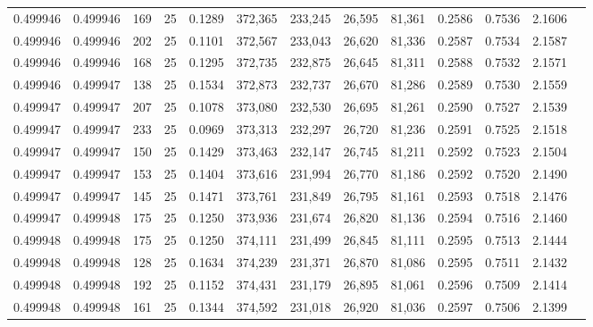 \begin{tabular}{rrrrrrrrrrrrr}
0.499946 & 0.499946 &   169 &  25 &                                     0.1289 & 372,365 & 233,245 &  26,595 &  81,361 & 0.2586 & 0.7536 & 2.1606 \\
0.499946 & 0.499946 &   202 &  25 &                                     0.1101 & 372,567 & 233,043 &  26,620 &  81,336 & 0.2587 & 0.7534 & 2.1587 \\
0.499946 & 0.499946 &   168 &  25 &                                     0.1295 & 372,735 & 232,875 &  26,645 &  81,311 & 0.2588 & 0.7532 & 2.1571 \\
0.499946 & 0.499947 &   138 &  25 &                                     0.1534 & 372,873 & 232,737 &  26,670 &  81,286 & 0.2589 & 0.7530 & 2.1559 \\
0.499947 & 0.499947 &   207 &  25 &                                     0.1078 & 373,080 & 232,530 &  26,695 &  81,261 & 0.2590 & 0.7527 & 2.1539 \\
0.499947 & 0.499947 &   233 &  25 &                                     0.0969 & 373,313 & 232,297 &  26,720 &  81,236 & 0.2591 & 0.7525 & 2.1518 \\
0.499947 & 0.499947 &   150 &  25 &                                     0.1429 & 373,463 & 232,147 &  26,745 &  81,211 & 0.2592 & 0.7523 & 2.1504 \\
0.499947 & 0.499947 &   153 &  25 &                                     0.1404 & 373,616 & 231,994 &  26,770 &  81,186 & 0.2592 & 0.7520 & 2.1490 \\
0.499947 & 0.499947 &   145 &  25 &                                     0.1471 & 373,761 & 231,849 &  26,795 &  81,161 & 0.2593 & 0.7518 & 2.1476 \\
0.499947 & 0.499948 &   175 &  25 &                                     0.1250 & 373,936 & 231,674 &  26,820 &  81,136 & 0.2594 & 0.7516 & 2.1460 \\
0.499948 & 0.499948 &   175 &  25 &                                     0.1250 & 374,111 & 231,499 &  26,845 &  81,111 & 0.2595 & 0.7513 & 2.1444 \\
0.499948 & 0.499948 &   128 &  25 &                                     0.1634 & 374,239 & 231,371 &  26,870 &  81,086 & 0.2595 & 0.7511 & 2.1432 \\
0.499948 & 0.499948 &   192 &  25 &                                     0.1152 & 374,431 & 231,179 &  26,895 &  81,061 & 0.2596 & 0.7509 & 2.1414 \\
0.499948 & 0.499948 &   161 &  25 &                                     0.1344 & 374,592 & 231,018 &  26,920 &  81,036 & 0.2597 & 0.7506 & 2.1399 \\

\end{tabular}
